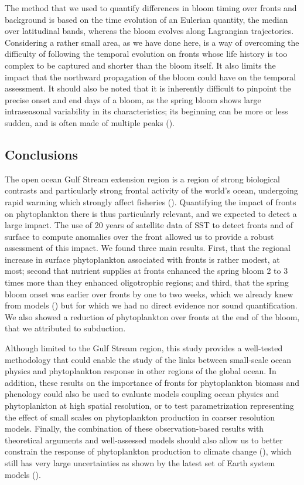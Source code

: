 The method that we used to quantify differences in bloom timing over fronts and background is based on the time evolution of an Eulerian quantity, the  median over latitudinal bands, whereas the bloom evolves along Lagrangian trajectories.
Considering a rather small area, as we have done here, is a way of overcoming the difficulty of following the temporal evolution on fronts whose life history is too complex to be captured and shorter than the bloom itself.
It also limits the impact that the northward propagation of the bloom could have on the temporal assessment.
It should also be noted that it is inherently difficult to pinpoint the precise onset and end days of a bloom, as the spring bloom shows large intraseasonal variability in its characteristics; its beginning can be more or less sudden, and is often made of multiple peaks (\cite{keerthi_2020}).


\subsection{Conclusions}

The open ocean Gulf Stream extension region is a region of strong biological contrasts and particularly strong frontal activity of the world's ocean, undergoing rapid warming which strongly affect fisheries (\cite{pershing_2015, neto_2021}).
Quantifying the impact of fronts on phytoplankton there is thus particularly relevant, and we expected to detect a large impact.
The use of 20 years of satellite data of SST to detect fronts and of surface  to compute anomalies over the front allowed us to provide a robust assessment of this impact.
We found three main results.
First, that the regional increase in surface phytoplankton associated with fronts is rather modest,  at most; second that nutrient supplies at fronts enhanced the spring bloom 2 to 3 times more than they enhanced oligotrophic regions; and third, that the spring bloom onset was earlier over fronts by one to two weeks, which we already knew from models (\cite{karleskind_2011, mahadevan_2012}) but for which we had no direct evidence nor sound quantification.
We also showed a reduction of phytoplankton over fronts at the end of the bloom, that we attributed to subduction.

Although limited to the Gulf Stream region, this study provides a well-tested methodology that could enable the study of the links between small-scale ocean physics and phytoplankton response in other regions of the global ocean.
In addition, these results on the importance of fronts for phytoplankton biomass and phenology could also be used to evaluate models coupling ocean physics and phytoplankton at high spatial resolution, or to test parametrization representing the effect of small scales on phytoplankton production in coarser resolution models.
Finally, the combination of these observation-based results with theoretical arguments and well-assessed models should also allow us to better constrain the response of phytoplankton production to climate change (\cite{couespel_2021}), which still has very large uncertainties as shown by the latest set of Earth system models (\cite{kwiatkowski_2020}).


